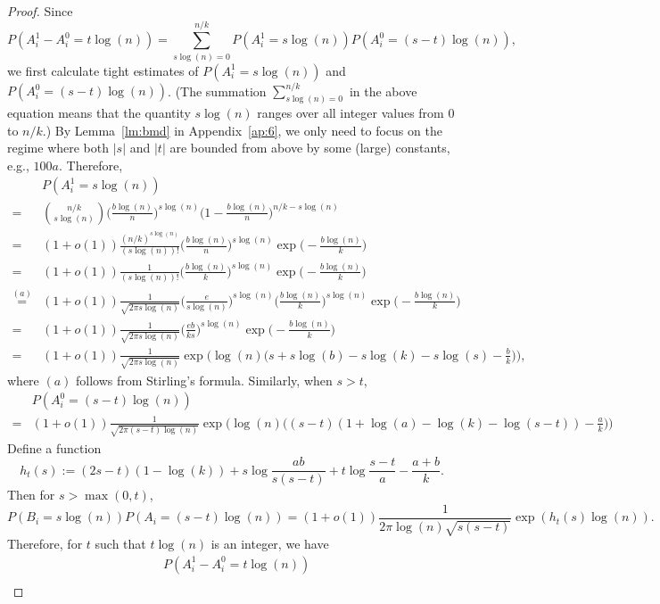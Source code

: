 \documentclass{article}
\begin{document}
\begin{proof}
Since
$$
P(A^1_i-A^0_i = t\log(n))
= \sum_{s\log(n)=0}^{n/k}
P(A^1_i = s\log(n)) P(A^0_i=(s-t)\log(n)) ,
$$
we first calculate tight estimates of $P(A^1_i = s\log(n))$ and $P(A^0_i=(s-t)\log(n))$. (The summation $\sum_{s\log(n)=0}^{n/k}$ in the above equation means that the quantity $s\log(n)$ ranges over all integer values from $0$ to $n/k$.)
By Lemma~\ref{lm:bmd} in Appendix~\ref{ap:6}, we only need to focus on the regime where both $|s|$ and $|t|$ are bounded from above by some (large) constants, e.g., $100a$.
Therefore,
\begin{align*}
& P(A^1_i = s\log(n)) \\
= & \binom{n/k}{s\log(n)}
\Big( \frac{b\log(n)}{n} \Big)^{s\log(n)}
\Big( 1- \frac{b\log(n)}{n} \Big)^{n/k-s\log(n)}  \\
= & (1+o(1))
\frac{(n/k)^{s\log(n)}}{(s\log(n))!} \Big( \frac{b\log(n)}{n} \Big)^{s\log(n)}
\exp \Big(-\frac{b\log(n)}{k} \Big)  \\
= & (1+o(1))
\frac{1} {(s\log(n))!} \Big( \frac{b\log(n)}{k} \Big)^{s\log(n)}
\exp \Big(-\frac{b\log(n)}{k} \Big)  \\
\overset{(a)}{=} & (1+o(1))
\frac{1} {\sqrt{2\pi s\log(n)}}
\Big(\frac{e}{s\log(n)} \Big)^{s\log(n)}
\Big( \frac{b\log(n)}{k} \Big)^{s\log(n)}
\exp \Big(-\frac{b\log(n)}{k} \Big)  \\
= & (1+o(1))
\frac{1} {\sqrt{2\pi s\log(n)}}
\Big( \frac{ e b }{ks} \Big)^{s\log(n)}
\exp \Big(-\frac{b\log(n)}{k} \Big) \\
= & (1+o(1))
\frac{1} {\sqrt{2\pi s\log(n)}}
\exp\Big( \log(n) \Big( 
s+ s\log(b)-s\log(k)-s\log(s)-\frac{b}{k}
\Big)\Big) ,
\end{align*}
where $(a)$ follows from Stirling's formula.
Similarly, when $s > t$,
\begin{align*}
& P(A^0_i=(s-t)\log(n)) \\
= & (1+o(1))
\frac{1} {\sqrt{2\pi (s-t)\log(n)}}
\exp\Big( \log(n) \Big( 
 (s-t)(1+\log(a)-\log(k)-\log(s-t))-\frac{a}{k}
\Big)\Big)
\end{align*}
Define a function
$$
h_t(s):=(2s-t)(1-\log(k))
+s\log\frac{ab}{s(s-t)}
+t\log\frac{s-t}{a} -\frac{a+b}{k} .
$$
Then for $s>\max(0,t)$,
$$
P(B_i = s\log(n)) P(A_i=(s-t)\log(n))
= (1+o(1)) \frac{1} {2\pi \log(n)\sqrt{s (s-t)}}
\exp(h_t(s) \log(n)) .
$$
Therefore, for $t$ such that $t\log(n)$ is an integer, we have
\begin{equation} \label{eq:gj}
\begin{aligned}
& P(A^1_i-A^0_i = t\log(n))  \\

\end{aligned}
\end{equation}
\end{proof}
\end{document}
